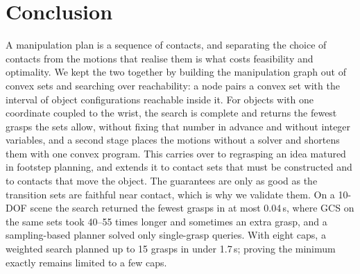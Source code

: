 \section{Conclusion}
\label{sec:conclusion}
A manipulation plan is a sequence of contacts, and separating the choice of
contacts from the motions that realise them is what costs feasibility and
optimality. We kept the two together by building the manipulation graph out of
convex sets and searching over reachability: a node pairs a convex set with
the interval of object configurations reachable inside it. For objects with
one coordinate coupled to the wrist, the search is complete and returns the
fewest grasps the sets allow, without fixing that number in advance and
without integer variables, and a second stage places the motions without a
solver and shortens them with one convex program. This
carries over to regrasping an idea matured in footstep planning, and extends
it to contact sets that must be constructed and to contacts that move the
object. The guarantees are only as good as the transition sets are faithful
near contact, which is why we validate them. On a 10-DOF scene the search
returned the fewest grasps in at most 0.04\,s, where GCS on the same sets took
40--55 times longer and sometimes an extra grasp, and a sampling-based planner
solved only single-grasp queries. With eight caps, a weighted search planned
up to 15 grasps in under 1.7\,s; proving the minimum exactly remains limited to a
few caps.
